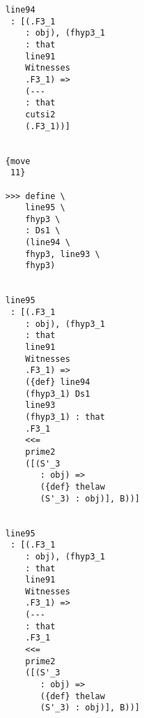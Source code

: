 \documentclass[12pt]{article}
\begin{document}
\begin{verbatim}
                                    line94 
                                     : [(.F3_1 
                                        : obj), (fhyp3_1 
                                        : that 
                                        line91 
                                        Witnesses 
                                        .F3_1) => 
                                        (--- 
                                        : that 
                                        cutsi2 
                                        (.F3_1))]


                                    {move 
                                     11}

                                    >>> define \
                                        line95 \
                                        fhyp3 \
                                        : Ds1 \
                                        (line94 \
                                        fhyp3, line93 \
                                        fhyp3)


                                    line95 
                                     : [(.F3_1 
                                        : obj), (fhyp3_1 
                                        : that 
                                        line91 
                                        Witnesses 
                                        .F3_1) => 
                                        ({def} line94 
                                        (fhyp3_1) Ds1 
                                        line93 
                                        (fhyp3_1) : that 
                                        .F3_1 
                                        <<= 
                                        prime2 
                                        ([(S'_3 
                                           : obj) => 
                                           ({def} thelaw 
                                           (S'_3) : obj)], B))]


                                    line95 
                                     : [(.F3_1 
                                        : obj), (fhyp3_1 
                                        : that 
                                        line91 
                                        Witnesses 
                                        .F3_1) => 
                                        (--- 
                                        : that 
                                        .F3_1 
                                        <<= 
                                        prime2 
                                        ([(S'_3 
                                           : obj) => 
                                           ({def} thelaw 
                                           (S'_3) : obj)], B))]



\end{verbatim}
\end{document}
